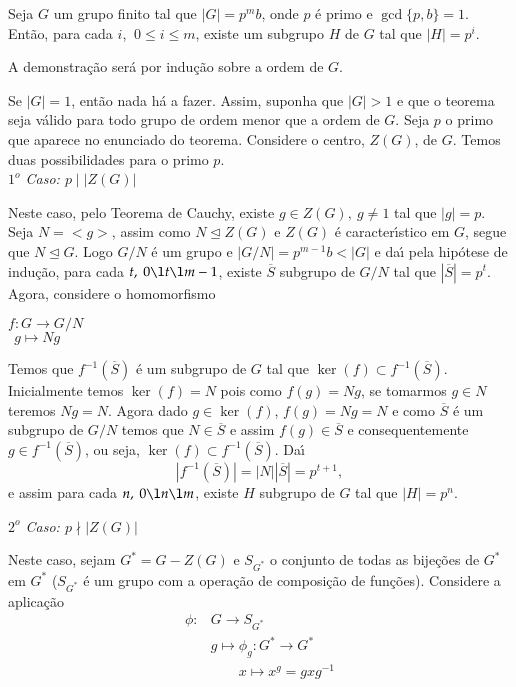 \begin{teorema}\label{primeiro_teorema_de_sylow}
Seja $G$ um grupo finito tal que \linebreak $|G| = p^m b$, onde $p$ {\'e} primo e $\gcd\{p, b\} = 1$. Ent{\~a}o, para cada $i$, $\ 0 \le i \le m$, existe um subgrupo $H$ de $G$ tal que $|H| = p^i$.
\end{teorema}
\begin{prova}
A demonstra{\c c}{\~a}o ser{\'a} por indu{\c c}{\~a}o sobre a ordem de $G$.

Se $|G| = 1$, ent{\~a}o nada h{\'a} a fazer. Assim, suponha que $|G| > 1$ e que o teorema seja v{\'a}lido para todo grupo de ordem menor que a ordem de
$G$. Seja $p$ o primo que aparece no enunciado do teorema. Considere o centro, $Z(G)$, de $G$. Temos duas possibilidades para o primo $p$.\\
\textit{$1^o$ Caso: $p \mid |Z(G)|$}

Neste caso, pelo Teorema de Cauchy, existe $g \in Z(G),\ g \neq 1$ tal que $|g| = p$. Seja $N = <g>$, assim como $N \trianglelefteq Z(G)$ e $Z(G)$ {\'e} caracter{\'\i}stico em $G$, segue que $N \trianglelefteq G$. Logo $G/N$ {\'e} um grupo e $|G/N| = p^{m-1}b < |G|$ e da{\'\i} pela hip{\'o}tese
de indu{\c c}{\~a}o, para cada $t,\ 0 \l t \l m-1$, existe $\overline{S}$ subgrupo de $G/N$ tal que $|\overline{S}| = p^t$. Agora, considere o homomorfismo
\begin{center}
$ f: G \to G/N$\\
$\ \ g \mapsto Ng$
\end{center}

Temos que $f^{-1}(\overline{S})$ {\'e} um subgrupo de $G$ tal que $\ker(f) \subset f^{-1}(\overline{S})$. Inicialmente temos $\ker (f) = N$ pois como
$f(g) = Ng$, se tomarmos $g \in N$  teremos $Ng = N$. Agora dado $g \in \ker (f)$, $f(g) = Ng = N$ e como $\overline{S}$ {\'e} um subgrupo de $G/N$ temos
que $N \in \overline{S}$ e assim $f(g) \in \overline{S}$ e consequentemente $g \in f^{-1} (\overline{S})$, ou seja, $\ker (f) \subset
f^{-1}(\overline{S})$. Da{\'\i} $$|f^{-1}(\overline{S})| = |N||\overline{S}| = p^{t+1},$$ e assim para cada $n,\ 0 \l n \l m$, existe $H$ subgrupo de $G$
tal que $|H| = p^n$.

\textit{$2^o$ Caso: $p \nmid |Z(G)|$}

Neste caso, sejam $G^* = G - Z(G)$ e $S_{G^*}$ o conjunto de todas as bije{\c c}{\~o}es de $G^*$ em $G^*$ ($S_{G^*}$ {\'e} um grupo com a opera{\c
c}{\~a}o de composi{\c c}{\~a}o de fun{\c c}{\~o}es). Considere a aplica{\c c}{\~a}o
\begin{align*}
\phi : & G \to S_{G^*}\\
&g \mapsto \phi_g : G^* \to G^*\\
&\qquad x \mapsto x^g = gxg^{-1}
\end{align*}


\end{prova}
